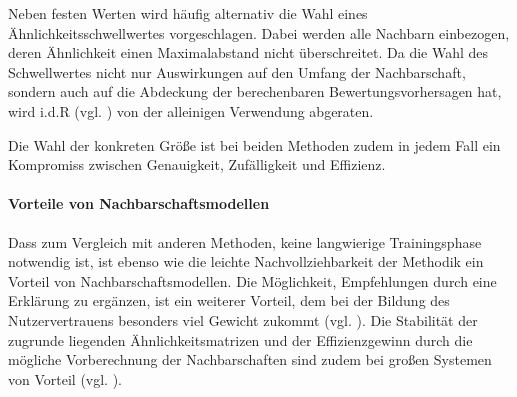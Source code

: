 Neben festen Werten wird häufig alternativ die Wahl eines Ähnlichkeitsschwellwertes vorgeschlagen. Dabei werden alle Nachbarn einbezogen, deren Ähnlichkeit einen Maximalabstand nicht überschreitet. Da die Wahl des Schwellwertes nicht nur Auswirkungen auf den Umfang der Nachbarschaft, sondern auch auf die Abdeckung der berechenbaren Bewertungsvorhersagen hat, wird i.d.R (vgl. \citep{Herlocker:2002:EAD:593967.594047, Herlocker:1999:AFP:312624.312682}) von der alleinigen Verwendung abgeraten.

Die Wahl der konkreten Größe ist bei beiden Methoden zudem in jedem Fall ein Kompromiss zwischen Genauigkeit, Zufälligkeit und Effizienz.

\paragraph{Vorteile von Nachbarschaftsmodellen} Dass zum Vergleich mit anderen Methoden, keine langwierige Trainingsphase notwendig ist, ist  ebenso wie die leichte Nachvollziehbarkeit der  Methodik ein Vorteil von Nachbarschaftsmodellen. Die Möglichkeit, Empfehlungen durch eine Erklärung zu ergänzen, ist ein weiterer Vorteil, dem bei der Bildung des Nutzervertrauens besonders viel Gewicht zukommt (vgl. \citep{hb_15}). Die Stabilität der zugrunde liegenden Ähnlichkeitsmatrizen und der Effizienzgewinn durch die mögliche Vorberechnung der Nachbarschaften sind zudem bei großen Systemen von Vorteil (vgl. \citep{linden03}).\citep{hb_04} 

